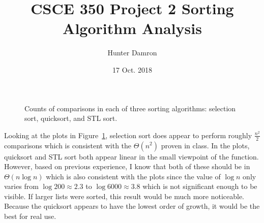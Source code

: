 \documentclass{article}
\title{CSCE 350 Project 2 Sorting Algorithm Analysis}
\author{Hunter Damron}
\date{17 Oct. 2018}
\begin{document}
  \maketitle

  \begin{figure}[h]
    \centering
    \qquad
    \caption{Counts of comparisons in each of three sorting algorithms: selection sort, quicksort, and STL sort.}
    \label{fig:plots}
  \end{figure}

  Looking at the plots in Figure~\ref{fig:plots}, selection sort does appear to perform roughly $\frac{n^2}{2}$ comparisons which is consistent with the $\Theta(n^2)$ proven in class.
  In the plots, quicksort and STL sort both appear linear in the small viewpoint of the function.
  However, based on previous experience, I know that both of these should be in $\Theta(n \log n)$ which is also consistent with the plots since the value of $\log n$ only varies from $\log 200 \approx 2.3$ to $\log 6000 \approx 3.8$ which is not significant enough to be visible.
  If larger lists were sorted, this result would be much more noticeable.
  Because the quicksort appears to have the lowest order of growth, it would be the best for real use.
\end{document}
